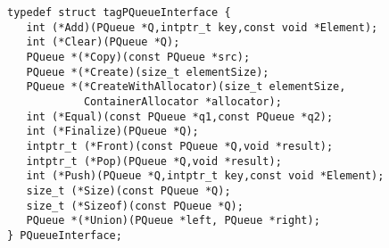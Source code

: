 \begin{verbatim}
typedef struct tagPQueueInterface {
   int (*Add)(PQueue *Q,intptr_t key,const void *Element);
   int (*Clear)(PQueue *Q);
   PQueue *(*Copy)(const PQueue *src);
   PQueue *(*Create)(size_t elementSize);
   PQueue *(*CreateWithAllocator)(size_t elementSize,
            ContainerAllocator *allocator);
   int (*Equal)(const PQueue *q1,const PQueue *q2);
   int (*Finalize)(PQueue *Q);
   intptr_t (*Front)(const PQueue *Q,void *result);
   intptr_t (*Pop)(PQueue *Q,void *result);
   int (*Push)(PQueue *Q,intptr_t key,const void *Element);
   size_t (*Size)(const PQueue *Q);
   size_t (*Sizeof)(const PQueue *Q);
   PQueue *(*Union)(PQueue *left, PQueue *right);
} PQueueInterface;
\end{verbatim}
